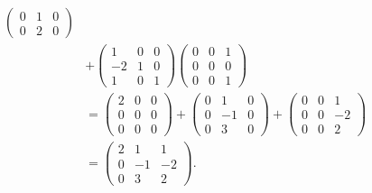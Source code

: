 ﻿\documentclass{book} \usepackage{exsheets} \usepackage{xeCJK}
\begin{document}
\begin{solution}
\begin{align*}
\begin{pmatrix}
                                          0&1&0\\
                                          0&2&0
                                        \end{pmatrix}\\&+ \begin{pmatrix}
                                          1&0&0\\
                                          -2&1&0\\
                                          1&0&1
                                        \end{pmatrix}
                                               \begin{pmatrix}
                                                 0&0&1\\
                                                 0&0&0\\
                                                 0&0&1
                                               \end{pmatrix}\\
       &=
         \begin{pmatrix}
           2&0&0\\
           0&0&0\\
           0&0&0
         \end{pmatrix}+
                \begin{pmatrix}
                  0&1&0\\
                  0&-1&0\\
                  0&3&0
                \end{pmatrix}+
                       \begin{pmatrix}
                         0&0&1\\
                         0&0&-2\\
                         0&0&2
                       \end{pmatrix}\\&=
                                        \begin{pmatrix}
                                          2&1&1\\
                                          0&-1&-2\\
                                          0&3&2
                                        \end{pmatrix}.
  \end{align*}
\end{solution}
\end{document}
